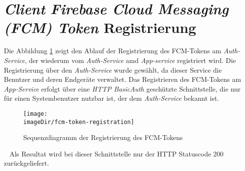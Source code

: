\documentclass[]{article}
\newcommand{\imageDir}{../../images}
\begin{document}
{{{{\section{\emph{Client} \emph{Firebase Cloud Messaging (FCM) Token} Registrierung}
Die Abbildung \ref{fig:image-sequence-fcm-token-registration} zeigt den Ablauf der Registrierung des FCM-Tokens am \emph{Auth-Service}, der wiederum vom \emph{Auth-Service} amd \emph{App-service} registriert wird. Die Registrierung über den \emph{Auth-Service} wurde gewählt, da dieser Service die Benutzer und deren Endgeräte verwaltet. Das Registrieren des FCM-Tokens am \emph{App-Service} erfolgt über eine \emph{HTTP BasicAuth} geschützte Schnittstelle, die nur für einen Systembenutzer nutzbar ist, der dem \emph{Auth-Service} bekannt ist. 
\begin{figure}[h]
	\centering
	\texttt{[image: \\imageDir/fcm-token-registration]}
	\caption{Sequenzdiagramm der Registrierung des FCM-Tokens}
	\label{fig:image-sequence-fcm-token-registration}
\end{figure}
\ \newline                        
Als Resultat wird bei dieser Schnittstelle nur der HTTP Statuscode 200 zurückgeliefert.

}}}}
\end{document}
